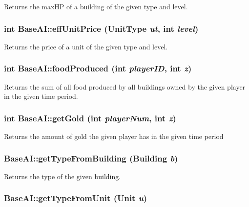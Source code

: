 Returns the maxHP of a building of the given type and level. \hypertarget{classBaseAI_680e404005de9fdc4165652ea5dcc95e}{
\subsubsection[{effUnitPrice}]{\setlength{\rightskip}{0pt plus 5cm}int BaseAI::effUnitPrice ({\bf UnitType} {\em ut}, \/  int {\em level})}}
\label{classBaseAI_680e404005de9fdc4165652ea5dcc95e}


Returns the price of a unit of the given type and level. \hypertarget{classBaseAI_43314f174d849c294ec84a09af6b55e2}{
\subsubsection[{foodProduced}]{\setlength{\rightskip}{0pt plus 5cm}int BaseAI::foodProduced (int {\em playerID}, \/  int {\em z})}}
\label{classBaseAI_43314f174d849c294ec84a09af6b55e2}


Returns the sum of all food produced by all buildings owned by the given player in the given time period. \hypertarget{classBaseAI_c079405ee4fd5cec789af0f627d3d175}{
\subsubsection[{getGold}]{\setlength{\rightskip}{0pt plus 5cm}int BaseAI::getGold (int {\em playerNum}, \/  int {\em z})}}
\label{classBaseAI_c079405ee4fd5cec789af0f627d3d175}


Returns the amount of gold the given player has in the given time period \hypertarget{classBaseAI_ca41bf18cdb670b9bcc5fe92eae198ad}{
\subsubsection[{getTypeFromBuilding}]{ BaseAI::getTypeFromBuilding ({\bf Building} {\em b})}}
\label{classBaseAI_ca41bf18cdb670b9bcc5fe92eae198ad}


Returns the type of the given building. \hypertarget{classBaseAI_9bd3c6a1259db084fa6780d50bea95eb}{
\subsubsection[{getTypeFromUnit}]{ BaseAI::getTypeFromUnit ({\bf Unit} {\em u})}}
\label{classBaseAI_9bd3c6a1259db084fa6780d50bea95eb}


